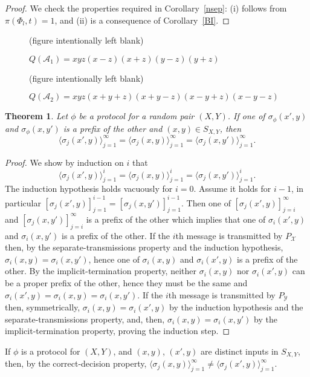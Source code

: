 \documentclass{article}
\newtheorem{thm}{Theorem}[section]
\theoremstyle{definition}
\theoremstyle{remark}
\newcommand{\A}{\mathcal{A}}
\newcommand{\st}{\sigma}
\newcommand{\XcY}{{(X,Y)}}
\newcommand{\SXY}{{S_{X,Y}}}
\newcommand{\PY}{{P_{\mathcal{Y}}}}
\newcommand{\X}{\mathcal{X}}
\begin{document}
\begin{proof}
We check the properties required in Corollary~\ref{nsep}:
(i) follows from $\pi (\Phi_{ l},t) = 1$, and (ii) is a
consequence of Corollary~\ref{BI}.
\end{proof}

\begin{figure}
\vspace{5cm}
(figure intentionally left blank)
\caption[]{$Q(\A_{1}) = xyz(x-z)(x+z)(y-z)(y+z)$}
\end{figure}

\begin{figure}
\vspace{5cm}
(figure intentionally left blank)
\caption[]{$Q(\A_{2})= xyz(x+y+z)(x+y-z)(x-y+z)(x-y-z)$}
\end{figure}


\begin{thm}
\label{T_first_the_int}
Let $\phi$ be a protocol for a random pair $\XcY$.
If one of $\st_\phi(x',y)$ and $\st_\phi(x,y')$ is a prefix of the other
and $(x,y)\in\SXY$, then
\[
\langle \st_j(x',y)\rangle_{j=1}^\infty
=\langle \st_j(x,y)\rangle_{j=1}^\infty
=\langle \st_j(x,y')\rangle_{j=1}^\infty .
\]
\end{thm}
\begin{proof}
We show by induction on $i$ that
\[
\langle \st_j(x',y)\rangle_{j=1}^i
=\langle \st_j(x,y)\rangle_{j=1}^i
=\langle \st_j(x,y')\rangle_{j=1}^i.
\]
The induction hypothesis holds vacuously for $i=0$. Assume it holds for
$i-1$, in particular
$[\st_j(x',y)]_{j=1}^{i-1}=[\st_j(x,y')]_{j=1}^{i-1}$. Then one of
$[\st_j(x',y)]_{j=i}^{\infty}$ and $[\st_j(x,y')]_{j=i}^{\infty}$ is a
prefix of the other which implies that one of $\st_i(x',y)$ and
$\st_i(x,y')$ is a prefix of the other. If the $i$th message is
transmitted by $P_\X$ then, by the separate-transmissions property and
the induction hypothesis, $\st_i(x,y)=\st_i(x,y')$, hence one of
$\st_i(x,y)$ and $\st_i(x',y)$ is a prefix of the other. By the
implicit-termination property, neither $\st_i(x,y)$ nor $\st_i(x',y)$
can be a proper prefix of the other, hence they must be the same and
$\st_i(x',y)=\st_i(x,y)=\st_i(x,y')$. If the $i$th message is
transmitted by $\PY$ then, symmetrically, $\st_i(x,y)=\st_i(x',y)$ by
the induction hypothesis and the separate-transmissions property, and,
then, $\st_i(x,y)=\st_i(x,y')$ by the implicit-termination property,
proving the induction step.
\end{proof}

If $\phi$ is a protocol for $(X,Y)$, and $(x,y)$, $(x',y)$ are distinct
inputs in $\SXY$, then, by the correct-decision property,
$\langle\st_j(x,y)\rangle_{j=1}^\infty\ne\langle
\st_j(x',y)\rangle_{j=1}^\infty$.
\end{document}
